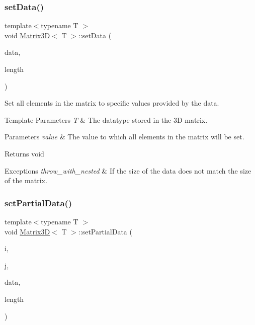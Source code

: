 \subsubsection{\texorpdfstring{set\+Data()}{setData()}}
{\footnotesize\ttfamily template$<$typename T $>$ \\
void \mbox{\hyperlink{classMatrix3D}{Matrix3D}}$<$ T $>$\+::set\+Data (\begin{DoxyParamCaption}\item[{T $\ast$}]{data,  }\item[{int}]{length }\end{DoxyParamCaption})}



Set all elements in the matrix to specific values provided by the data. 


\begin{DoxyTemplParams}{Template Parameters}
{\em T} & The datatype stored in the 3D matrix. \\
\hline
\end{DoxyTemplParams}

\begin{DoxyParams}{Parameters}
{\em value} & The value to which all elements in the matrix will be set.\\
\hline
\end{DoxyParams}
\begin{DoxyReturn}{Returns}
void
\end{DoxyReturn}

\begin{DoxyExceptions}{Exceptions}
{\em throw\+\_\+with\+\_\+nested} & If the size of the data does not match the size of the matrix. \\
\hline
\end{DoxyExceptions}
\mbox{\label{classMatrix3D_a46a7b732a44b77f6c09f72c0ae05edef}} 
\subsubsection{\texorpdfstring{set\+Partial\+Data()}{setPartialData()}}
{\footnotesize\ttfamily template$<$typename T $>$ \\
void \mbox{\hyperlink{classMatrix3D}{Matrix3D}}$<$ T $>$\+::set\+Partial\+Data (\begin{DoxyParamCaption}\item[{int}]{i,  }\item[{int}]{j,  }\item[{T $\ast$}]{data,  }\item[{int}]{length }\end{DoxyParamCaption})}




